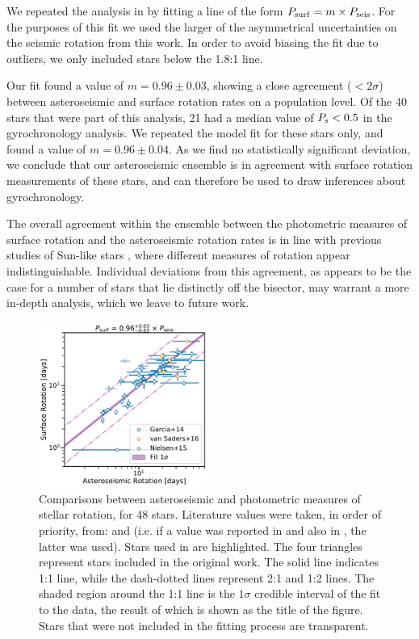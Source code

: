 \documentclass[12pt]{article}
\begin{document}
We repeated the analysis in \cite{nielsen+2015} by fitting a line of the form $P_{\rm surf} = m \times P_{\rm seis}$. For the purposes of this fit we used the larger of the asymmetrical uncertainties on the seismic rotation from this work. In order to avoid biasing the fit due to outliers, we only included stars below the 1.8:1 line.

Our fit found a value of $m = 0.96\pm0.03$, showing a close agreement ($< 2\sigma$) between asteroseismic and surface rotation rates on a population level. Of the 40 stars that were part of this analysis, 21 had a median value of $P_{\rm s} < 0.5$ in the gyrochronology analysis. We repeated the model fit for these stars only, and found a value of $m = 0.96 \pm 0.04$. As we find no statistically significant deviation, we conclude that our asteroseismic ensemble is in agreement with surface rotation measurements of these stars, and can therefore be used to draw inferences about gyrochronology.

The overall agreement within the ensemble between the photometric measures of surface rotation and the asteroseismic rotation rates is in line with previous studies of Sun-like stars \cite{gizon+2013, chaplin+2013, nielsen+2015, benomar+2015}, where different measures of rotation appear indistinguishable.
Individual deviations from this agreement, as appears to be the case for a number of stars that lie distinctly off the bisector, may warrant a more in-depth analysis, which we leave to future work.

\begin{figure}
	\centering
	\includegraphics[width=0.49\textwidth]{Images/surf-seis-comparison.pdf}
	\caption{Comparisons between asteroseismic and photometric measures of stellar rotation, for 48 stars. Literature values were taken, in order of priority, from: \cite{garcia+2014} and \cite{nielsen+2013} (i.e. if a value was reported in \cite{nielsen+2013} and also in \cite{garcia+2014}, the latter was used). Stars used in \cite{vansaders+2016} are highlighted. The four triangles represent stars included in the original \cite{nielsen+2015} work. The solid line indicates 1:1 line, while the dash-dotted lines represent 2:1 and 1:2 lines. The shaded region around the 1:1 line is the $1\sigma$ credible interval of the fit to the data, the result of which is shown as the title of the figure. Stars that were not included in the fitting process are transparent.}
	\label{fig:protlit}
\end{figure}
\end{document}
